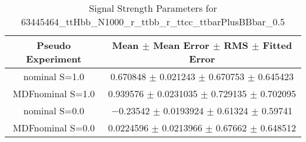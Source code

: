 \begin{table}
\centering
\caption{Signal Strength Parameters for 63445464\_ttHbb\_N1000\_r\_ttbb\_r\_ttcc\_ttbarPlusBBbar\_0.5}
\begin{tabular}{cc}
\toprule
Pseudo Experiment & Mean $\pm$ Mean Error $\pm$ RMS $\pm$ Fitted Error\\
\midrule
nominal S=1.0 & \num{0.670848} $\pm$ \num{0.021243} $\pm$ \num{0.670753} $\pm$ \num{0.645423}\\
MDFnominal S=1.0 & \num{0.939576} $\pm$ \num{0.0231035} $\pm$ \num{0.729135} $\pm$ \num{0.702095}\\
nominal S=0.0 & \num{-0.23542} $\pm$ \num{0.0193924} $\pm$ \num{0.61324} $\pm$ \num{0.59741}\\
MDFnominal S=0.0 & \num{0.0224596} $\pm$ \num{0.0213966} $\pm$ \num{0.67662} $\pm$ \num{0.648512}\\
\bottomrule
\end{tabular}
\end{table}
